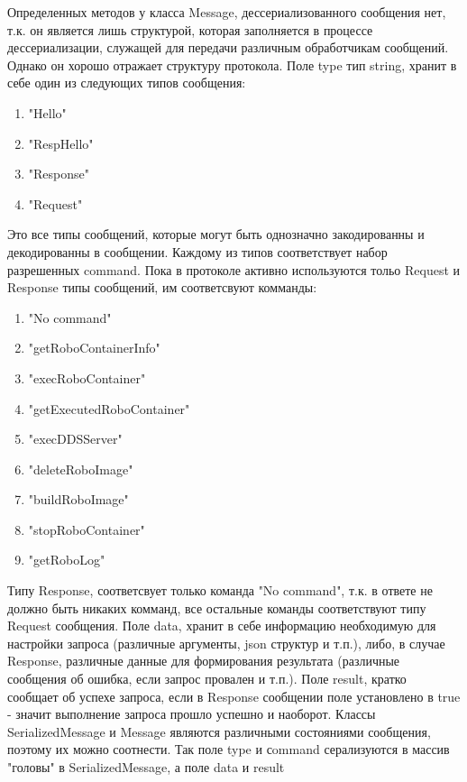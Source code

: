 \documentclass[a4paper, 14pt]{extreport}
\begin{document}
\par Определенных методов у класса Message, дессериализованного сообщения нет, т.к. он является лишь структурой, которая заполняется в 
процессе дессериализации, служащей для передачи различным обработчикам сообщений. Однако он хорошо отражает структуру протокола. 
Поле type тип string, хранит в себе один из следующих типов сообщения:
\begin{enumerate}
        \item "Hello"
        \item "RespHello"
        \item "Response"
        \item "Request"
\end{enumerate}
\par Это все типы сообщений, которые могут быть однозначно закодированны и декодированны в сообщении. Каждому из типов соответствует 
набор разрешенных command. Пока в протоколе активно используются тольо Request и Response типы сообщений, им соответсвуют комманды:
\begin{enumerate}
        \item "No command"
        \item "getRoboContainerInfo"
        \item "execRoboContainer"
        \item "getExecutedRoboContainer"
        \item "execDDSServer"
        \item "deleteRoboImage"
        \item "buildRoboImage"
        \item "stopRoboContainer"
        \item "getRoboLog"
\end{enumerate}
\par Типу Response, соответсвует только команда "No command", т.к. в ответе не должно быть никаких комманд, все остальные команды 
соответствуют типу Request сообщения. Поле data, хранит в себе информацию необходимую для настройки запроса (различные аргументы, 
json структур и т.п.), либо, в случае Response, различные данные для формирования результата (различные сообщения об ошибка, если 
запрос провален и т.п.). Поле result, кратко сообщает об успехе запроса, если в Response сообщении поле установлено в true
- значит выполнение запроса прошло успешно и наоборот. Классы SerializedMessage и Message являются различными состояниями сообщения,
поэтому их можно соотнести. Так поле type и сommand серализуются в массив "головы" в SerializedMessage, а поле data и result 
\end{document}
